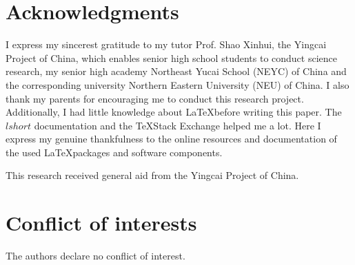 \documentclass{aims}
\numberwithin{equation}{section}
\numberwithin{theorem}{section}	%
\numberwithin{axiom}{section}	%
\numberwithin{definition}{section}	%
\begin{document}
	\section*{Acknowledgments}
	I express my sincerest gratitude to my tutor Prof. Shao Xinhui, the Yingcai Project of China, which enables senior high school students to conduct science research, my senior high academy Northeast Yucai School (NEYC) of China and the corresponding university Northern Eastern University (NEU) of China. I also thank my parents for encouraging me to conduct this research project. Additionally, I had little knowledge about \LaTeX before writing this paper. The $lshort$ documentation and the \TeX Stack Exchange helped me a lot. Here I express my genuine thankfulness to the online resources and documentation of the used \LaTeX packages and software components. 
	
	 This research received general aid from the Yingcai Project of China.
	
	\section*{Conflict of interests}
	
	The authors declare no conflict of interest.
	
\end{document}

